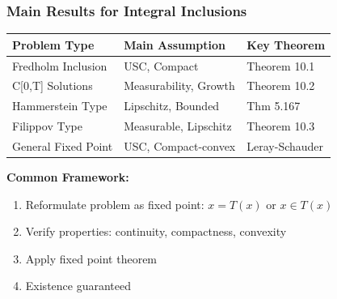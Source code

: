 \documentclass[aspectratio=169,10pt]{beamer}
\begin{document}
\begin{frame}
\frametitle{Main Results for Integral Inclusions}

\begin{table}
\centering
\small
\begin{tabular}{|p{3cm}|p{3cm}|p{2cm}|}
\hline
\textbf{Problem Type} & \textbf{Main Assumption} & \textbf{Key Theorem} \\
\hline
Fredholm Inclusion & USC, Compact & Theorem 10.1 \\
\hline
C[0,T] Solutions & Measurability, Growth & Theorem 10.2 \\
\hline
Hammerstein Type & Lipschitz, Bounded & Thm 5.167 \\
\hline
Filippov Type & Measurable, Lipschitz & Theorem 10.3 \\
\hline
General Fixed Point & USC, Compact-convex & Leray-Schauder \\
\hline
\end{tabular}
\end{table}

\vspace{0.5cm}

\textbf{Common Framework:}
\begin{enumerate}
    \item Reformulate problem as fixed point: $x = T(x)$ or $x \in T(x)$
    \item Verify properties: continuity, compactness, convexity
    \item Apply fixed point theorem
    \item Existence guaranteed
\end{enumerate}

\end{frame}
\end{document}
